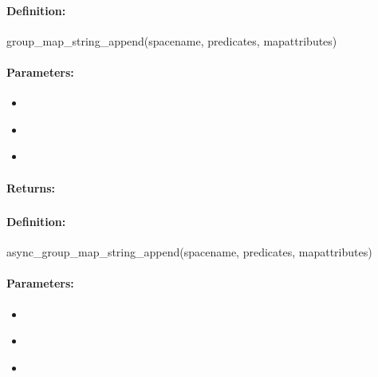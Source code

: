 \paragraph{Definition:}
\begin{rubycode}
group_map_string_append(spacename, predicates, mapattributes)
\end{rubycode}

\paragraph{Parameters:}
\begin{itemize}[noitemsep]
\item {}\\

\item {}\\

\item {}\\

\end{itemize}

\paragraph{Returns:}


\pagebreak
\subsubsection{}
\label{api:ruby:async_group_map_string_append}


\paragraph{Definition:}
\begin{rubycode}
async_group_map_string_append(spacename, predicates, mapattributes)
\end{rubycode}

\paragraph{Parameters:}
\begin{itemize}[noitemsep]
\item {}\\

\item {}\\

\item {}\\

\end{itemize}

